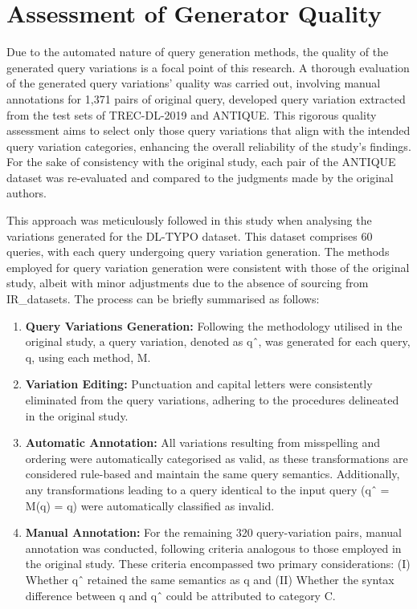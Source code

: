 \section{Assessment of Generator Quality}
Due to the automated nature of query generation methods, the quality of the generated query variations is a focal point of this research. A thorough evaluation of the generated query variations' quality was carried out, involving manual annotations for 1,371 pairs of {original query, developed query variation} extracted from the test sets of TREC-DL-2019 and ANTIQUE. This rigorous quality assessment aims to select only those query variations that align with the intended query variation categories, enhancing the overall reliability of the study's findings. For the sake of consistency with the original study, each pair of the ANTIQUE dataset was re-evaluated and compared to the judgments made by the original authors.

This approach was meticulously followed in this study when analysing the variations generated for the DL-TYPO dataset. This dataset comprises 60 queries, with each query undergoing query variation generation. The methods employed for query variation generation were consistent with those of the original study, albeit with minor adjustments due to the absence of sourcing from IR\_datasets. The process can be briefly summarised as follows:

\begin{enumerate}
\item \textbf{Query Variations Generation:} Following the methodology utilised in the original study, a query variation, denoted as qˆ, was generated for each query, q, using each method, M.
\item \textbf{Variation Editing:} Punctuation and capital letters were consistently eliminated from the query variations, adhering to the procedures delineated in the original study.
\item \textbf{Automatic Annotation:} All variations resulting from misspelling and ordering were automatically categorised as valid, as these transformations are considered rule-based and maintain the same query semantics. Additionally, any transformations leading to a query identical to the input query (qˆ = M(q) = q) were automatically classified as invalid.
\item \textbf{Manual Annotation:} For the remaining 320 query-variation pairs, manual annotation was conducted, following criteria analogous to those employed in the original study. These criteria encompassed two primary considerations: (I) Whether qˆ retained the same semantics as q and (II) Whether the syntax difference between q and qˆ could be attributed to category C.
\end{enumerate}

